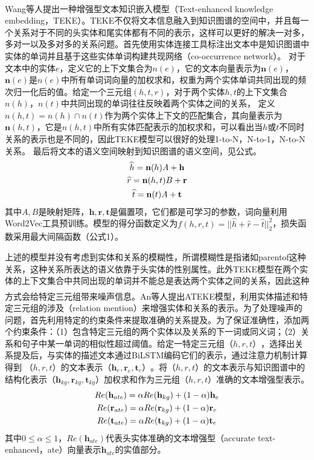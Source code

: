 \documentclass[twocolumn]{article}
\newcommand{\upcite}[1]{\textsuperscript{\textsuperscript{\cite{#1}}}}
\begin{document}
	Wang等人\upcite{TEKE}提出一种增强型文本知识嵌入模型（Text-enhanced knowledge embedding，TEKE）。TEKE不仅将文本信息融入到知识图谱的空间中，并且每一个关系对于不同的头实体和尾实体都有不同的表示，这样可以更好的解决一对多，多对一以及多对多的关系问题。首先使用实体连接工具标注出文本中是知识图谱中实体的单词并且基于这些实体单词构建共现网络（co-occurrence network）。
	对于文本中的实体$e$，定义它的上下文集合为$n(e)$，它的文本向量表示为$\textbf{n}(e)$，$\textbf{n}(e)$是$n(e)$中所有单词词向量的加权求和，权重为两个实体单词共同出现的频次归一化后的值。给定一个三元组$(h,t,r)$，对于两个实体$h,t$的上下文集合$n(h)$，$n(t)$中共同出现的单词往往反映着两个实体之间的关系，
	定义$n(h,t)=n(h)\cap n(t)$作为两个实体上下文的匹配集合，其向量表示为$\textbf{n}(h,t)$，它是$n(h,t)$中所有实体匹配表示的加权求和，可以看出当$h$或$t$不同时关系的表示也是不同的，因此TEKE模型可以很好的处理1-to-N，N-to-1，N-to-N关系。
	最后将文本的语义空间映射到知识图谱的语义空间，见公式。
	\begin{gather}
		\widehat{h}=\textbf{n}(h)A+\textbf{h} \notag \\
		\widehat{r}=\textbf{n}(h,t)B+\textbf{r} \\
		\widehat{t}=\textbf{n}(t)A+\textbf{t} \notag
	\end{gather}
	其中$A,B$是映射矩阵，$\textbf{h},\textbf{r},\textbf{t}$是偏置项，它们都是可学习的参数，词向量利用Word2Vec工具预训练。模型的得分函数定义为$f(h,r,t)=||\widehat{h}+\widehat{r}-\widehat{t}||_2^2$，损失函数采用最大间隔函数（公式1）。
	
	上述的模型并没有考虑到实体和关系的模糊性，所谓模糊性是指诸如parentof这种关系，这种关系所表达的语义依靠于头实体的性别属性。此外TEKE模型在两个实体的上下文集合中共同出现的单词并不能总是表达两个实体之间的关系，因此这种方式会给特定三元组带来噪声信息。An等人\upcite{ATEKE}提出ATEKE模型，利用实体描述和特定三元组的涉及（relation mention）来增强实体和关系的表示。为了处理噪声的问题，首先利用特定的约束条件来提取准确的关系提及。为了保证准确性，添加两个约束条件：（1）包含特定三元组的两个实体以及关系的下一词或同义词；（2）关系和句子中某一单词的相似性超过阈值。给定一特定三元组$（h,r,t）$，选择出关系提及后，与实体的描述文本通过BiLSTM编码它们的表示，通过注意力机制计算得到
	$（h,r,t）$的文本表示$（\textbf{h}_e,\textbf{r}_e,\textbf{t}_e）$。将$（h,r,t）$的文本表示与知识图谱中的结构化表示$（\textbf{h}_{kg},\textbf{r}_{kg},\textbf{t}_{kg}）$加权求和作为三元组$（h,r,t）$准确的文本增强型表示。
	\begin{gather}
		Re(\textbf{h}_{ate})=\alpha Re(\textbf{h}_{kg})+(1-\alpha)\textbf{h}_e \notag \\
		Re(\textbf{r}_{ate})=\alpha Re(\textbf{r}_{kg})+(1-\alpha)\textbf{r}_e \notag \\
		Re(\textbf{t}_{ate})=\alpha Re(\textbf{t}_{kg})+(1-\alpha)\textbf{t}_e \notag
	\end{gather}
	其中$0\leq \alpha \leq 1$，$Re(\textbf{h}_{ate})$代表头实体准确的文本增强型（accurate text-enhanced，ate）向量表示$\textbf{h}_{ate}$的实值部分。
	
\end{document}
